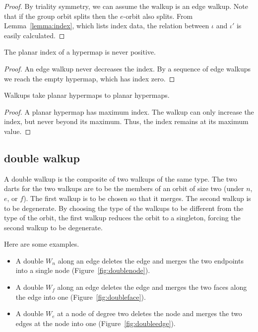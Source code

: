 \begin{proof}  By triality symmetry, 
we can assume the walkup is an edge walkup.  
Note that
if the group orbit splits then
the $e$-orbit also splits.
From Lemma~\ref{lemma:index},
which lists index data, the
relation between $\iota$ and $\iota'$ is easily calculated.
\end{proof}


\begin{lemma}  
The planar index
of a hypermap is never positive.
\end{lemma}

\begin{proof}  An edge walkup never decreases the index.  By a sequence
of edge walkups we reach the empty hypermap, which has
index zero.
\end{proof}


\begin{lemma}
Walkups take planar hypermaps to planar
hypermaps.
\end{lemma}

\begin{proof}  
A planar hypermap has maximum index.  The walkup
can only increase the index, but never beyond its maximum.  
Thus, the index remains at its maximum value.
\end{proof}


\subsection{double walkup}

A double walkup is the composite of two walkups
of the same type.  The
two darts for the two walkups 
are to be the members of an orbit of size
two (under $n$, $e$, or $f$).  The first walkup is to be
chosen so that it merges.  The second walkup is
to be degenerate.
By choosing the type of the walkups to be different from the type of
the orbit, the first walkup reduces the orbit to a singleton,
forcing the second walkup to be degenerate. 
 
Here are some examples.
\begin{itemize}
    \item A double $W_n$ along an edge deletes the edge and 
   merges the two endpoints into
    a single node (Figure~\ref{fig:doublenode}). 
    \item A double $W_f$ along an edge 
    deletes the edge and merges the two faces along the edge into
    one (Figure~\ref{fig:doubleface}).
    \item A double $W_e$ at a node of degree two
    deletes the node and merges the two edges at the node into
    one (Figure~\ref{fig:doubleedge}).
\end{itemize}


